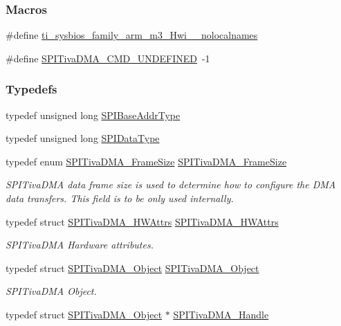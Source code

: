 \subsubsection*{Macros}
\begin{DoxyCompactItemize}
\item 
\#define \hyperlink{_s_p_i_tiva_d_m_a_8h_aaa17ecf48f5762e2e1bdb0bab8aacf0c}{ti\-\_\-sysbios\-\_\-family\-\_\-arm\-\_\-m3\-\_\-\-Hwi\-\_\-\-\_\-nolocalnames}
\item 
\#define \hyperlink{_s_p_i_tiva_d_m_a_8h_a265c7aa839623d2c27b685cfb59ef654}{S\-P\-I\-Tiva\-D\-M\-A\-\_\-\-C\-M\-D\-\_\-\-U\-N\-D\-E\-F\-I\-N\-E\-D}~-\/1
\end{DoxyCompactItemize}
\subsubsection*{Typedefs}
\begin{DoxyCompactItemize}
\item 
typedef unsigned long \hyperlink{_s_p_i_tiva_d_m_a_8h_a4b7e9f3739f6196bed13f9c3c549c96d}{S\-P\-I\-Base\-Addr\-Type}
\item 
typedef unsigned long \hyperlink{_s_p_i_tiva_d_m_a_8h_ac69c2f2d8cda29733c058bf8e0233af7}{S\-P\-I\-Data\-Type}
\item 
typedef enum \hyperlink{_s_p_i_tiva_d_m_a_8h_a65cb55b42cf383ece69876f50ba2d0a4}{S\-P\-I\-Tiva\-D\-M\-A\-\_\-\-Frame\-Size} \hyperlink{_s_p_i_tiva_d_m_a_8h_ae24d181062a7ee8b005ec1718f52a46e}{S\-P\-I\-Tiva\-D\-M\-A\-\_\-\-Frame\-Size}
\begin{DoxyCompactList}\small\item\em S\-P\-I\-Tiva\-D\-M\-A data frame size is used to determine how to configure the D\-M\-A data transfers. This field is to be only used internally. \end{DoxyCompactList}\item 
typedef struct \hyperlink{struct_s_p_i_tiva_d_m_a___h_w_attrs}{S\-P\-I\-Tiva\-D\-M\-A\-\_\-\-H\-W\-Attrs} \hyperlink{_s_p_i_tiva_d_m_a_8h_ab2566f4cb348d144220085b8fad1dee6}{S\-P\-I\-Tiva\-D\-M\-A\-\_\-\-H\-W\-Attrs}
\begin{DoxyCompactList}\small\item\em S\-P\-I\-Tiva\-D\-M\-A Hardware attributes. \end{DoxyCompactList}\item 
typedef struct \hyperlink{struct_s_p_i_tiva_d_m_a___object}{S\-P\-I\-Tiva\-D\-M\-A\-\_\-\-Object} \hyperlink{_s_p_i_tiva_d_m_a_8h_aa431693a87cbc8cced0555e211d34c2b}{S\-P\-I\-Tiva\-D\-M\-A\-\_\-\-Object}
\begin{DoxyCompactList}\small\item\em S\-P\-I\-Tiva\-D\-M\-A Object. \end{DoxyCompactList}\item 
typedef struct \hyperlink{struct_s_p_i_tiva_d_m_a___object}{S\-P\-I\-Tiva\-D\-M\-A\-\_\-\-Object} $\ast$ \hyperlink{_s_p_i_tiva_d_m_a_8h_a4848d0474d4445327fb598373df1a8e3}{S\-P\-I\-Tiva\-D\-M\-A\-\_\-\-Handle}
\end{DoxyCompactItemize}
